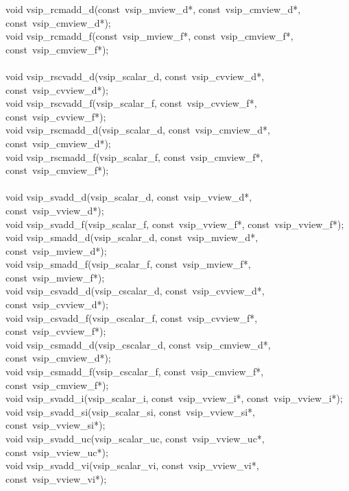 \begin{cfuncs}
void vsip\_rcmadd\_d(const~vsip\_mview\_d*, const~vsip\_cmview\_d*, const~vsip\_cmview\_d*);\Bs\\
void vsip\_rcmadd\_f(const~vsip\_mview\_f*, const~vsip\_cmview\_f*, const~vsip\_cmview\_f*);\Bs\\
\\ \hline
void vsip\_rscvadd\_d(vsip\_scalar\_d, const~vsip\_cvview\_d*, const~vsip\_cvview\_d*);\Bs\\
void vsip\_rscvadd\_f(vsip\_scalar\_f, const~vsip\_cvview\_f*, const~vsip\_cvview\_f*);\Bs\\
void vsip\_rscmadd\_d(vsip\_scalar\_d, const~vsip\_cmview\_d*, const~vsip\_cmview\_d*);\Bs\\
void vsip\_rscmadd\_f(vsip\_scalar\_f, const~vsip\_cmview\_f*, const~vsip\_cmview\_f*);\Bs\\
\\ \hline
void vsip\_svadd\_d(vsip\_scalar\_d, const~vsip\_vview\_d*, const~vsip\_vview\_d*);\Bs\\
void vsip\_svadd\_f(vsip\_scalar\_f, const~vsip\_vview\_f*, const~vsip\_vview\_f*);\Bs\\
void vsip\_smadd\_d(vsip\_scalar\_d, const~vsip\_mview\_d*, const~vsip\_mview\_d*);\Bs\\
void vsip\_smadd\_f(vsip\_scalar\_f, const~vsip\_mview\_f*, const~vsip\_mview\_f*);\Bs\\
void vsip\_csvadd\_d(vsip\_cscalar\_d, const~vsip\_cvview\_d*, const~vsip\_cvview\_d*);\Bs\\
void vsip\_csvadd\_f(vsip\_cscalar\_f, const~vsip\_cvview\_f*, const~vsip\_cvview\_f*);\Bs\\
void vsip\_csmadd\_d(vsip\_cscalar\_d, const~vsip\_cmview\_d*, const~vsip\_cmview\_d*);\Bs\\
void vsip\_csmadd\_f(vsip\_cscalar\_f, const~vsip\_cmview\_f*, const~vsip\_cmview\_f*);\Bs\\
void vsip\_svadd\_i(vsip\_scalar\_i, const~vsip\_vview\_i*, const~vsip\_vview\_i*);\Bs\\
void vsip\_svadd\_si(vsip\_scalar\_si, const~vsip\_vview\_si*, const~vsip\_vview\_si*);\Bs\\
void vsip\_svadd\_uc(vsip\_scalar\_uc, const~vsip\_vview\_uc*, const~vsip\_vview\_uc*);\Bs\\
void vsip\_svadd\_vi(vsip\_scalar\_vi, const~vsip\_vview\_vi*, const~vsip\_vview\_vi*);\Bs\\
\end{cfuncs}
